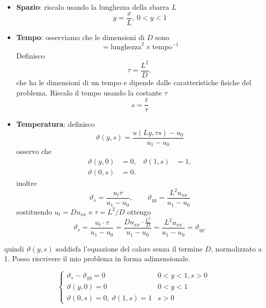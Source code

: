 \documentclass[10pt,a4paper,twoside,openright]{book}
\begin{document}
\begin{itemize}
\item \textbf{Spazio}: riscalo usando la lunghezza della sbarra $L$
\begin{equation*}
y=\frac{x}{L},\ 0< y< 1
\end{equation*}
\item \textbf{Tempo}: osserviamo che le dimensioni di $D$ sono
\begin{equation*}
[D] =\text{lunghezza}^{2} \times \text{tempo}^{-1}
\end{equation*}
Definisco
\begin{equation*}
	\tau =\frac{L^{2}}{D},
\end{equation*}
che ha le dimensioni di un tempo e dipende dalle caratteristiche fisiche del problema. Riscalo il tempo usando la costante $\tau$
\begin{equation*}
	s=\frac{t}{\tau}
\end{equation*}
\item \textbf{Temperatura}: definisco
\begin{equation*}
\vartheta (y,s) =\frac{u(Ly,\tau s) -u_{0}}{u_{1} -u_{0}}
\end{equation*}
osservo che
\begin{align*}
\vartheta (y,0) & =0, & \vartheta (1,s) & =1,\\
\vartheta (0,s) & =0. &  & 
\end{align*}
inoltre
\begin{equation*}
\vartheta _{s} =\frac{u_{t} \tau }{u_{1} -u_{0}} ,\qquad \vartheta _{yy} =\frac{L^{2} u_{xx}}{u_{1} -u_{0}}
\end{equation*}
sostituendo $u_{t} =Du_{xx}$ e $\tau =L^{2} /D$ ottengo
\begin{equation*}
\vartheta _{s} =\frac{u_{t} \cdotp \tau }{u_{1} -u_{0}} =\frac{Du_{xx} \cdotp \frac{L^{2}}{D}}{u_{1} -u_{0}} =\frac{L^{2} u_{xx}}{u_{1} -u_{0}} =\vartheta _{yy} .
\end{equation*}
\end{itemize}
quindi $\vartheta(y,s)$ soddisfa l'equazione del calore senza il termine $D$, normalizzato a 1. Posso riscrivere il mio problema in forma adimensionale.

\begin{equation*}
\begin{cases}
\vartheta_{s} -\vartheta_{yy} =0 & 0< y< 1,s >0\\
\vartheta(y,0) =0 & 0< y< 1\\
\vartheta(0,s) =0,\ \vartheta(1,s) =1 & s >0
\end{cases}
\end{equation*}
\end{document}
